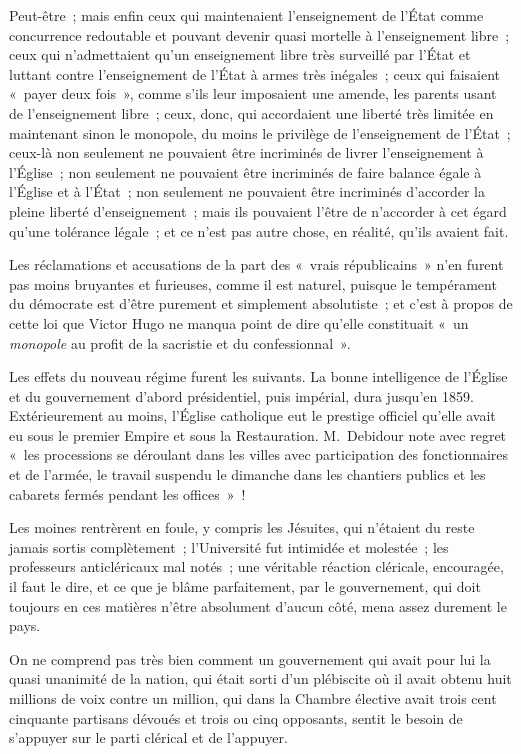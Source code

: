 \documentclass[french,twoside]{book} %
\begin{document}
\noindent Peut-être ; mais enfin ceux qui maintenaient l’enseignement de l’État comme concurrence redoutable et pouvant devenir quasi mortelle à l’enseignement libre ; ceux qui n’admettaient qu’un enseignement libre très surveillé par l’État et luttant  contre l’enseignement de l’État à armes très inégales ; ceux qui faisaient « payer deux fois », comme s’ils leur imposaient une amende, les parents usant de l’enseignement libre ; ceux, donc, qui accordaient une liberté très limitée en maintenant sinon le monopole, du moins le privilège de l’enseignement de l’État ; ceux-là non seulement ne pouvaient être incriminés de livrer l’enseignement à l’Église ; non seulement ne pouvaient être incriminés de faire balance égale à l’Église et à l’État ; non seulement ne pouvaient être incriminés d’accorder la pleine liberté d’enseignement ; mais ils pouvaient l’être de n’accorder à cet égard qu’une tolérance légale ; et ce n’est pas autre chose, en réalité, qu’ils avaient fait.\par
Les réclamations et accusations de la part des « vrais républicains » n’en furent pas moins bruyantes et furieuses, comme il est naturel, puisque le tempérament du démocrate est d’être purement et simplement absolutiste ; et c’est à propos de cette loi que Victor Hugo ne manqua point de dire qu’elle constituait « un {\itshape monopole} au profit de la sacristie et du confessionnal ».\par
Les effets du nouveau régime furent les suivants. La bonne intelligence de l’Église et du gouvernement d’abord présidentiel, puis impérial, dura jusqu’en 1859. Extérieurement au moins,  l’Église catholique eut le prestige officiel qu’elle avait eu sous le premier Empire et sous la Restauration. M. Debidour note avec regret « les processions se déroulant dans les villes avec participation des fonctionnaires et de l’armée, le travail suspendu le dimanche dans les chantiers publics et les cabarets fermés pendant les offices » !\par
Les moines rentrèrent en foule, y compris les Jésuites, qui n’étaient du reste jamais sortis complètement ; l’Université fut intimidée et molestée ; les professeurs anticléricaux mal notés ; une véritable réaction cléricale, encouragée, il faut le dire, et ce que je blâme parfaitement, par le gouvernement, qui doit toujours en ces matières n’être absolument d’aucun côté, mena assez durement le pays.\par
On ne comprend pas très bien comment un gouvernement qui avait pour lui la quasi unanimité de la nation, qui était sorti d’un plébiscite où il avait obtenu huit millions de voix contre un million, qui dans la Chambre élective avait trois cent cinquante partisans dévoués et trois ou cinq opposants, sentit le besoin de s’appuyer sur le parti clérical et de l’appuyer.\par
\end{document}

